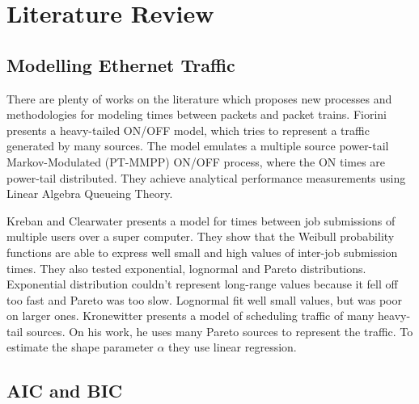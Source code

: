 \section{Literature Review}\label{sec:review}

\subsection{Modelling Ethernet Traffic}

There are plenty of works on the literature which proposes new processes and methodologies for modeling times between packets and packet trains. Fiorini \cite{modeling-concurrent-heavy-tailed} presents a heavy-tailed ON/OFF model, which tries to represent a traffic generated by many sources. The model emulates a multiple source power-tail Markov-Modulated (PT-MMPP) ON/OFF process, where the ON times are power-tail distributed. They achieve analytical performance measurements using Linear Algebra Queueing Theory.

Kreban and Clearwater\cite{hierarchical-dynamics-interarrival-times} presents a model for times between job submissions of multiple users over a super computer. They show that the Weibull probability functions are able to express well small and high values of inter-job submission times. They also tested exponential, lognormal and Pareto distributions. Exponential distribution couldn't  represent long-range values because it fell off too fast and Pareto was too slow. Lognormal fit well small values, but was poor on larger ones. Kronewitter\cite{optimal-scheduling-of-heavy-tailed-traffic} presents a model of scheduling traffic of many heavy-tail sources. On his work, he uses many Pareto sources to represent the traffic. To estimate the shape parameter $\alpha$ they use linear regression.


\subsection{AIC and BIC}

